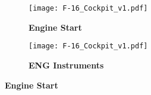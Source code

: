 \documentclass[fontInter]{TechCheck}
\begin{document}
	\begin{figure}[h]
		\centering
		\begin{subfigure}[t]{0.45\linewidth}
			\centering
			\texttt{[image: F-16\_Cockpit\_v1.pdf]}
			\caption*{\textbf{Engine Start}}
		\end{subfigure}
		\begin{subfigure}[t]{0.45\linewidth}
			\centering
			\texttt{[image: F-16\_Cockpit\_v1.pdf]}
			\caption*{\textbf{ENG Instruments}}
		\end{subfigure}
		\caption{\textbf{Engine Start}}
		\label{fig:proc:engstart}
	\end{figure}


	\clearpage
\end{document}
